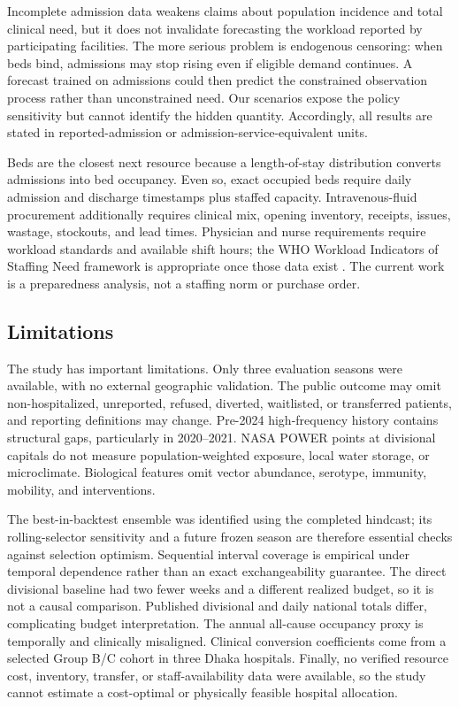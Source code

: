 \documentclass[11pt]{article}
\begin{document}
Incomplete admission data weakens claims about population incidence and total clinical need, but it does not invalidate forecasting the workload reported by participating facilities. The more serious problem is endogenous censoring: when beds bind, admissions may stop rising even if eligible demand continues. A forecast trained on admissions could then predict the constrained observation process rather than unconstrained need. Our scenarios expose the policy sensitivity but cannot identify the hidden quantity. Accordingly, all results are stated in reported-admission or admission-service-equivalent units.

Beds are the closest next resource because a length-of-stay distribution converts admissions into bed occupancy. Even so, exact occupied beds require daily admission and discharge timestamps plus staffed capacity. Intravenous-fluid procurement additionally requires clinical mix, opening inventory, receipts, issues, wastage, stockouts, and lead times. Physician and nurse requirements require workload standards and available shift hours; the WHO Workload Indicators of Staffing Need framework is appropriate once those data exist \citep{whoWisn}. The current work is a preparedness analysis, not a staffing norm or purchase order.

\subsection{Limitations}

The study has important limitations. Only three evaluation seasons were available, with no external geographic validation. The public outcome may omit non-hospitalized, unreported, refused, diverted, waitlisted, or transferred patients, and reporting definitions may change. Pre-2024 high-frequency history contains structural gaps, particularly in 2020--2021. NASA POWER points at divisional capitals do not measure population-weighted exposure, local water storage, or microclimate. Biological features omit vector abundance, serotype, immunity, mobility, and interventions.

The best-in-backtest ensemble was identified using the completed hindcast; its rolling-selector sensitivity and a future frozen season are therefore essential checks against selection optimism. Sequential interval coverage is empirical under temporal dependence rather than an exact exchangeability guarantee. The direct divisional baseline had two fewer weeks and a different realized budget, so it is not a causal comparison. Published divisional and daily national totals differ, complicating budget interpretation. The annual all-cause occupancy proxy is temporally and clinically misaligned. Clinical conversion coefficients come from a selected Group B/C cohort in three Dhaka hospitals. Finally, no verified resource cost, inventory, transfer, or staff-availability data were available, so the study cannot estimate a cost-optimal or physically feasible hospital allocation.
\end{document}

